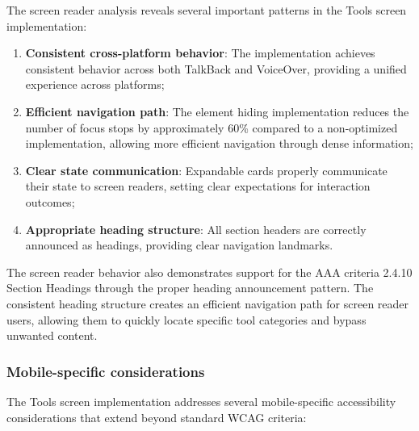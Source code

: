 The screen reader analysis reveals several important patterns in the Tools screen implementation:

\begin{enumerate}
    \item \textbf{Consistent cross-platform behavior}: The implementation achieves consistent behavior across both TalkBack and VoiceOver, providing a unified experience across platforms;
    
    \item \textbf{Efficient navigation path}: The element hiding implementation reduces the number of focus stops by approximately 60\% compared to a non-optimized implementation, allowing more efficient navigation through dense information;
    
    \item \textbf{Clear state communication}: Expandable cards properly communicate their state to screen readers, setting clear expectations for interaction outcomes;
    
    \item \textbf{Appropriate heading structure}: All section headers are correctly announced as headings, providing clear navigation landmarks.
\end{enumerate}

The screen reader behavior also demonstrates support for the AAA criteria 2.4.10 Section Headings through the proper heading announcement pattern. The consistent heading structure creates an efficient navigation path for screen reader users, allowing them to quickly locate specific tool categories and bypass unwanted content.

\subsubsection{Mobile-specific considerations}

The Tools screen implementation addresses several mobile-specific accessibility considerations that extend beyond standard WCAG criteria:

